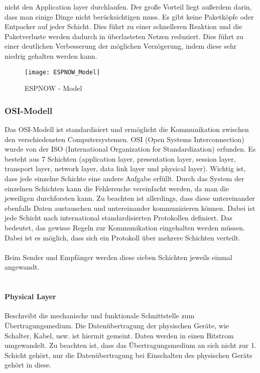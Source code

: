 \documentclass[titlepage,12pt,twoside]{article}
\begin{document}
nicht den Application layer durchlaufen. Der große Vorteil liegt außerdem 
darin, dass man einige Dinge nicht berücksichtigen muss. Es gibt keine 
Paketköpfe oder Entpacker auf jeder Schicht. Dies führt zu einer schnelleren 
Reaktion und die Paketverluste werden dadurch in überlasteten Netzen 
reduziert. Dies führt zu einer deutlichen Verbesserung der möglichen 
Verzögerung, indem diese sehr niedrig gehalten werden kann. \\
\begin{figure}[H]
	\begin{center}
		\scalebox{1.0}
		{\texttt{[image: ESPNOW\_Model]}}
		\caption{ESPNOW - Model}
		\label{fig:ESPNOW_Model}
	\end{center}
\end{figure}

\subsubsection{OSI-Modell}
Das OSI-Modell ist standardisiert und ermöglicht die Kommunikation zwischen den 
verschiedensten Computersystemen. OSI (Open Systems Interconnection) wurde von der 
ISO (International Organization for Standardization) erfunden. 
Es besteht aus 7 Schichten (application layer, presentation layer, session layer, 
transport layer, network layer, data link layer und physical layer). Wichtig ist, 
dass jede einzelne Schichte eine andere Aufgabe erfüllt. Durch das System der 
einzelnen Schichten kann die Fehlersuche vereinfacht werden, da man die jeweiligen 
durchforsten kann. Zu beachten ist allerdings, dass diese untereinander ebenfalls 
Daten austauschen und untereinander kommunizieren können. Dabei ist jede Schicht 
nach international standardisierten Protokollen definiert. Das bedeutet, das gewisse 
Regeln zur Kommunikation eingehalten werden müssen. Dabei ist es möglich, dass sich 
ein Protokoll über mehrere Schichten verteilt. \\
\\
Beim Sender und Empfänger werden diese sieben Schichten jeweils einmal angewandt. \\
\\

\paragraph{Physical Layer}
\hfill \break
\hfill \break
Beschreibt die mechanische und funktionale Schnittstelle zum Übertragungsmedium. Die 
Datenübertragung der physischen Geräte, wie Schalter, Kabel, usw. ist hiermit gemeint. 
Daten werden in einen Bitstrom umgewandelt. Zu beachten ist, dass das Übertragungsmedium 
an sich nicht zur 1. Schicht gehört, nur die Datenübertragung bei Einschalten des 
physischen Geräts gehört in diese.\\
\end{document}

